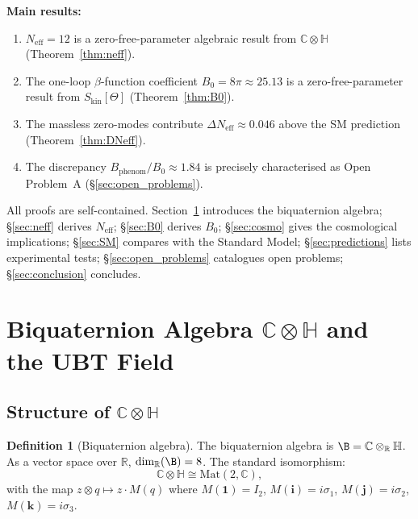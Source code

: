 \documentclass[12pt,a4paper]{article}
\theoremstyle{definition}
\newtheorem{definition}[theorem]{Definition}
\theoremstyle{remark}
\newcommand{\C}{\mathbb{C}}
\newcommand{\R}{\mathbb{R}}
\renewcommand{\H}{\mathbb{H}}
\begin{document}
\textbf{Main results:}
\begin{enumerate}
  \item[(R1)] $N_{\mathrm{eff}} = 12$ is a zero-free-parameter algebraic result
    from $\C\otimes\H$ (Theorem~\ref{thm:neff}).
  \item[(R2)] The one-loop $\beta$-function coefficient
    $B_0 = 8\pi \approx 25.13$ is a zero-free-parameter result
    from $S_{\mathrm{kin}}[\Theta]$ (Theorem~\ref{thm:B0}).
  \item[(R3)] The massless zero-modes contribute
    $\Delta N_{\mathrm{eff}} \approx 0.046$
    above the SM prediction (Theorem~\ref{thm:DNeff}).
  \item[(R4)] The discrepancy $B_{\mathrm{phenom}}/B_0 \approx 1.84$
    is precisely characterised as Open Problem~A
    (\S\ref{sec:open_problems}).
\end{enumerate}

All proofs are self-contained.  Section~\ref{sec:algebra} introduces the
biquaternion algebra; \S\ref{sec:neff} derives $N_{\mathrm{eff}}$;
\S\ref{sec:B0} derives $B_0$; \S\ref{sec:cosmo} gives the cosmological
implications; \S\ref{sec:SM} compares with the Standard Model;
\S\ref{sec:predictions} lists experimental tests;
\S\ref{sec:open_problems} catalogues open problems;
\S\ref{sec:conclusion} concludes.

\section{Biquaternion Algebra $\C\otimes\H$ and the UBT Field}
\label{sec:algebra}

\subsection{Structure of $\C\otimes\H$}

\begin{definition}[Biquaternion algebra]
The biquaternion algebra is $\B = \C\otimes_{\R}\H$.
As a vector space over $\R$, $\dim_{\R}(\B) = 8$.
The standard isomorphism:
\begin{equation}
  \C\otimes\H \cong \mathrm{Mat}(2,\C),
\label{eq:iso}
\end{equation}
with the map $z\otimes q \mapsto z\cdot M(q)$ where
$M(\mathbf{1})=I_2$, $M(\mathbf{i})=i\sigma_1$, $M(\mathbf{j})=i\sigma_2$,
$M(\mathbf{k})=i\sigma_3$.
\end{definition}
\end{document}
